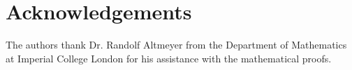 \section{Acknowledgements}\noindent
The authors thank Dr. Randolf Altmeyer from the Department of Mathematics at Imperial College London for his assistance with the mathematical proofs.
